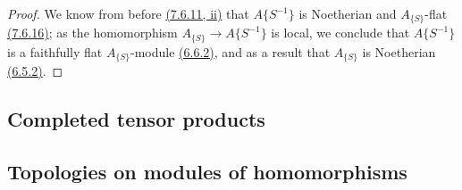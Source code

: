 \begin{proof}
\label{proof-cor-0.7.6.18}
We know from before \hyperref[prop-0.7.6.11]{(7.6.11, ii)} that $A\{S^{-1}\}$ is Noetherian and
$A_{\{S\}}$-flat \hyperref[prop-0.7.6.16]{(7.6.16)}; as the homomorphism $A_{\{S\}}\to A\{S^{-1}\}$
is local, we conclude that $A\{S^{-1}\}$ is a faithfully flat $A_{\{S\}}$-module
\hyperref[env-0.6.6.2]{(6.6.2)}, and as a result that $A_{\{S\}}$ is Noetherian
\hyperref[env-0.6.5.2]{(6.5.2)}.
\end{proof}

\subsection{Completed tensor products}
\label{subsection-completed-tensor-prods}

\subsection{Topologies on modules of homomorphisms}
\label{subsection-topologies-on-hom-modules}


